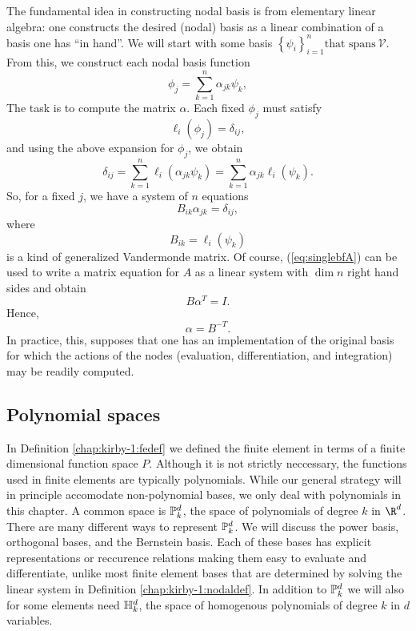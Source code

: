 The fundamental idea in constructing nodal basis is from elementary
linear algebra: one constructs the desired (nodal) basis as a linear
combination of a basis one has ``in hand''.  We will start with some
basis \( \left\{ \psi_i \right\}_{i=1}^{n} \mbox{that spans} \  \mathcal{V}  \).  From
this, we construct each nodal basis function
\begin{equation}
 \phi_j = \sum_{k=1}^n \alpha_{jk} \psi_k,
\end{equation}
The task is to compute the matrix \( \alpha \).  Each fixed \( \phi_j \) must
satisfy
\begin{equation}
\ell_i( \phi_j ) = \delta_{ij},
\end{equation}
and using the above expansion for \( \phi_j \), we obtain
\begin{equation}
\delta_{ij} = \sum_{k=1}^n \ell_i( \alpha_{jk} \psi_{k} ) = \sum_{k=1}^n \alpha_{jk} \ell_i (\psi_k).
\end{equation}
So, for a fixed \( j \), we have a system of \( n \) equations
\begin{equation}
\label{eq:singlebfA}
B_{ik} \alpha_{jk} = \delta_{ij},
\end{equation}
where
\begin{equation}
B_{ik} = \ell_i(\psi_k)
\end{equation}
is a kind of generalized Vandermonde matrix.   Of course, (\ref{eq:singlebfA}) can be used
to write a matrix equation for \( A \) as a linear system with \( \dim
n \) right hand sides and obtain
\begin{equation}
B \alpha^T = I.
\end{equation}
Hence, 
\begin{equation}
\alpha = B^{-T}.
\end{equation}
In practice, this, supposes that one has an implementation of
the original basis for which the actions of the nodes (evaluation,
differentiation, and integration) may be readily computed.


\subsection{Polynomial spaces}
In Definition \ref{chap:kirby-1:fedef} we defined the finite element in terms
of a finite dimensional function space $P$. Although it is not strictly
neccessary,
the functions used in finite elements are typically polynomials.
While our general strategy will in principle accomodate non-polynomial bases, we
only deal with polynomials in this chapter.
A common space is
$\P_k^d$, the space of polynomials of degree $k$ in $\R^d$. There
are many different ways to represent $\P^d_k$. We will discuss the power
basis, orthogonal bases, and the Bernstein basis.  Each of these bases
has explicit representations or reccurence relations making them easy to 
evaluate and differentiate, 
unlike most finite element bases that are determined by solving 
the linear system in Definition \ref{chap:kirby-1:nodaldef}.
In addition to $\P^d_k$ we will also for some
elements need $\H^d_k$, the space of homogenous polynomials of degree
\( k \) in \( d \) variables.

